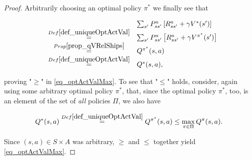 \documentclass[11pt]{article} %
\begin{document}
\begin{proof}
	Arbitrarily choosing an optimal policy $\pi^*$ we finally see that

	\begin{equation}
		\begin{array}{rcl}
			& & \sum_{s'} P_{ss'}^a \left[ R_{ss'}^a + \gamma V^*(s') \right] \\
			& \overset{Def \ref{def_uniqueOptActVal}}{=} & \sum_{s'} P_{ss'}^a \left[ R_{ss'}^a + \gamma V^{\pi^*}(s') \right] \\
			& \overset{Prop \ref{prop_qVRelShips}}{=} & Q^{\pi^*}(s,a) \\
			& \overset{Def \ref{def_uniqueOptActVal}}{=} & Q^*(s,a),
		\end{array}
	\end{equation}

	proving "$\ge$" in \ref{eq_optActValMax}. To see that "$\le$" holds, consider, again using some arbitrary optimal policy $\pi^*$, that, since the optimal policy $\pi^*$, too, is an element of the set of \textit{all} policies $\Pi$, we also have

	\begin{equation}
		Q^*(s,a) \overset{Def \ref{def_uniqueOptActVal}}{=} Q^{\pi^*}(s,a) \le \max_{\pi \in \Pi} Q^{\pi}(s,a).
	\end{equation}

	Since $(s,a) \in S \times A$ was arbitrary, $\ge$ and $\le$ together yield \ref{eq_optActValMax}.
\end{proof}
\end{document}
